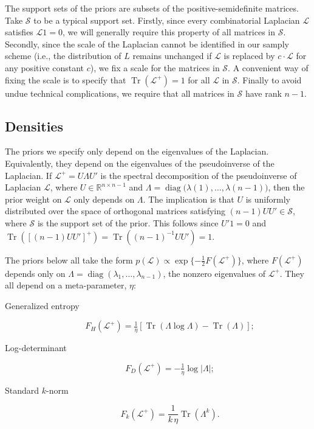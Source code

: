 \documentclass[12pt]{article}
\newcommand{\reals}{\mathbb{R}}
\DeclareMathOperator*{\Tr}{Tr}
\DeclareMathOperator*{\diag}{diag}
\theoremstyle{plain}
\begin{document}
The support sets of the priors are subsets of the
positive-semidefinite matrices.  Take $\mathcal{S}$ to be a typical
support set.  Firstly, since every combinatorial Laplacian
$\mathcal{L}$ satisfies $\mathcal{L} 1 = 0$, we will generally require
this property of all matrices in $\mathcal{S}$.  Secondly, since the
scale of the Laplacian cannot be identified in our samply scheme
(i.e., the distribution of $L$ remains unchanged if $\mathcal{L}$ is
replaced by $c \cdot \mathcal{L}$ for any positive constant $c$), we
fix a scale for the matrices in $\mathcal{S}$.  A convenient way of
fixing the scale is to specify that $\Tr(\mathcal{L}^+) = 1$ for
all $\mathcal{L}$ in $\mathcal{S}$.  Finally to avoid undue technical
complications, we require that all matrices in $\mathcal{S}$ have rank
$n-1$.



\subsection{Densities}

The priors we specify only depend on the eigenvalues of the Laplacian.
Equivalently, they depend on the eigenvalues of the pseudoinverse of
the Laplacian.  If $\mathcal{L}^+ = U \Lambda U'$ is the spectral
decomposition of the pseudoinverse of Laplacian $\mathcal{L}$, where
$U \in \reals^{n \times n -1}$ and
$\Lambda = \diag\big(\lambda(1), \dotsc, \lambda({n-1})\big)$, then the prior
weight on $\mathcal{L}$ only depends on $\Lambda$.  The implication is
that $U$ is uniformly distributed over the space of orthogonal
matrices satisfying $(n-1) U U' \in \mathcal{S}$, where $\mathcal{S}$ is the
support set of the prior.  This follows since $U'1 = 0$ and $\Tr([(n-1) U U']^+) =
\Tr((n-1)^{-1} U U') = 1$.

The priors below all take the form $p(\mathcal{L}) \propto
\exp\{-\tfrac{1}{2} F(\mathcal{L}^{+})\}$, where $F(\mathcal{L}^{+})$
depends only on $\Lambda = \diag(\lambda_1, \dotsc, \lambda_{n-1})$, the nonzero
eigenvalues of $\mathcal{L}^{+}$.  They all depend on a
meta-parameter, $\eta$:

\begin{description}
  \item[Generalized entropy]
    \[
      F_H(\mathcal{L}^+) = \tfrac{1}{\eta}[ \Tr( \Lambda \log \Lambda)
      - \Tr(\Lambda)];
    \]
  \item[Log-determinant]
    \[
      F_D(\mathcal{L}^{+}) = - \tfrac{1}{\eta} \log |\Lambda|;
    \]
  \item[Standard $k$-norm]
    \[
      F_k(\mathcal{L}^+)
        = \frac{1}{k \, \eta} \Tr(\Lambda^k).
  \]
\end{description}
 
\end{document}
